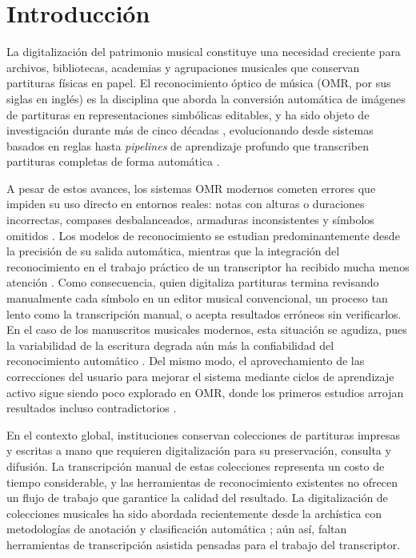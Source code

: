 \section{Introducci\'on}

La digitalizaci\'on del patrimonio musical constituye una necesidad
creciente para archivos, bibliotecas, academias y agrupaciones musicales
que conservan partituras f\'isicas en papel. El reconocimiento \'optico de
m\'usica (OMR, por sus siglas en ingl\'es) es la disciplina que aborda la
conversi\'on autom\'atica de im\'agenes de partituras en representaciones
simb\'olicas editables, y ha sido objeto de investigaci\'on durante m\'as de
cinco d\'ecadas \cite{omr2020}, evolucionando desde sistemas basados en
reglas hasta \emph{pipelines} de aprendizaje profundo que transcriben
partituras completas de forma autom\'atica
\cite{rebelo2012}\cite{calvo2018}\cite{riosvila2026}.

A pesar de estos avances, los sistemas OMR modernos cometen errores que
impiden su uso directo en entornos reales: notas con alturas o duraciones
incorrectas, compases desbalanceados, armaduras inconsistentes y s\'imbolos
omitidos \cite{calvo2018}. Los modelos de reconocimiento se estudian
predominantemente desde la precisi\'on de su salida autom\'atica, mientras
que la integraci\'on del reconocimiento en el trabajo pr\'actico de un
transcriptor ha recibido mucha menos atenci\'on \cite{rizo2023}. Como
consecuencia, quien digitaliza partituras termina revisando manualmente
cada s\'imbolo en un editor musical convencional, un proceso tan lento como
la transcripci\'on manual, o acepta resultados err\'oneos sin verificarlos.
En el caso de los manuscritos musicales modernos, esta situaci\'on se
agudiza, pues la variabilidad de la escritura degrada a\'un m\'as la
confiabilidad del reconocimiento autom\'atico \cite{ricordi2024}. Del mismo
modo, el aprovechamiento de las correcciones del usuario para mejorar el
sistema mediante ciclos de aprendizaje activo sigue siendo poco explorado
en OMR, donde los primeros estudios arrojan resultados incluso
contradictorios \cite{mlsp2025}.

En el contexto global, instituciones conservan colecciones de partituras
impresas y escritas a mano que requieren digitalizaci\'on para su
preservaci\'on, consulta y difusi\'on. La transcripci\'on manual de estas
colecciones representa un costo de tiempo considerable, y las herramientas
de reconocimiento existentes no ofrecen un flujo de trabajo que garantice
la calidad del resultado. La digitalizaci\'on de colecciones musicales ha
sido abordada recientemente desde la arch\'istica con metodolog\'ias de
anotaci\'on y clasificaci\'on autom\'atica \cite{ricordi2024}; a\'un as\'i,
faltan herramientas de transcripci\'on asistida pensadas para el trabajo
del transcriptor.

